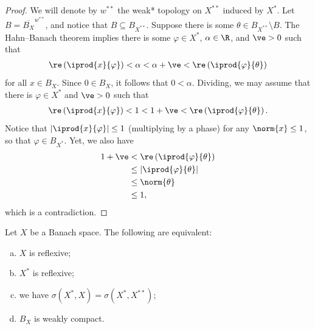 \documentclass[10pt]{mypackage}
\begin{document}
\begin{proof}
  We will denote by $w^{\ast\ast}$ the weak* topology on $X^{\ast\ast}$ induced by $X^{\ast}$. Let $B = \overline{B_X}^{w^{\ast\ast}}$, and notice that $B\subseteq B_{X^{\ast\ast}}$. Suppose there is some $\theta\in B_{X^{\ast\ast}}\setminus B$. The Hahn--Banach theorem implies there is some $\varphi\in X^{\ast}$, $\alpha\in \R$, and $\ve > 0$ such that
  \begin{align*}
    \re \left( \iprod{x}{\varphi} \right) < \alpha < \alpha + \ve < \re\left( \iprod{\varphi}{\theta} \right)
  \end{align*}
  for all $x\in B_X$. Since $0\in B_X$, it follows that $0 < \alpha$. Dividing, we may assume that there is $\varphi\in X^{\ast}$ and $\ve > 0$ such that
  \begin{align*}
    \re\left( \iprod{x}{\varphi} \right) < 1 < 1 + \ve < \re\left( \iprod{\varphi}{\theta} \right).
  \end{align*}
  Notice that $\left\vert \iprod{x}{\varphi} \right\vert \leq 1$ (multiplying by a phase) for any $\norm{x}\leq 1$, so that $\varphi\in B_{X^{\ast}}$. Yet, we also have
  \begin{align*}
    1 + \ve &< \re\left( \iprod{\varphi}{\theta} \right)\\
            &\leq \left\vert \iprod{\varphi}{\theta} \right\vert\\
            &\leq \norm{\theta}\\
            &\leq 1,
  \end{align*}
  which is a contradiction.
\end{proof}
\begin{theorem}
  Let $X$ be a Banach space. The following are equivalent:
  \begin{enumerate}[(a)]
    \item $X$ is reflexive;
    \item $X^{\ast}$ is reflexive;
    \item we have $ \sigma\left( X^{\ast},X \right) = \sigma\left( X^{\ast},X^{\ast\ast} \right) $;
    \item $B_X$ is weakly compact.
  \end{enumerate}
\end{theorem}
\end{document}
